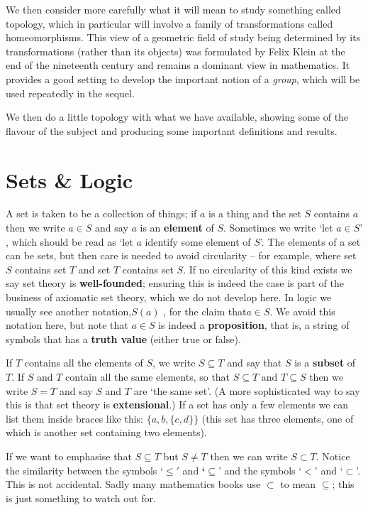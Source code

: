 \documentclass[oneside,english]{amsbook}
\numberwithin{section}{chapter}
\theoremstyle{plain}
\theoremstyle{definition}
\begin{document}
We then consider more carefully what it will mean to study something called topology, which in particular will involve a family of transformations called homeomorphisms. This view of a geometric field of study being determined by its transformations (rather than its objects) was formulated by Felix Klein at the end of the nineteenth century and remains a dominant view in mathematics. It provides a good setting to develop the important notion of a \emph{group}, which will be used repeatedly in the sequel.

We then do a little topology with what we have available, showing some of the flavour of the subject and producing some important definitions and results. 

\section{Sets \& Logic}

A set is taken to be a collection of things; if $a$ is a thing and the set $S$ contains $a$ then we write $a\in S$ and say $a$ is an \textbf{element} of $S$. Sometimes we write `let $a\in S$' , which should be read as `let $a$ identify some element of $S$'. The elements of a set can be sets, but then care is needed to avoid circularity -- for example, where set $S$ contains set $T$ and set $T$ contains set $S$. If no circularity of this kind exists we say set theory is \textbf{well-founded}; ensuring this is indeed the case is part of the business of axiomatic set theory, which we do not develop here. In logic we usually see another notation,$S(a)$ , for the claim that$a\in S$. We avoid this notation here, but note that $a\in S$ is indeed a \textbf{proposition}, that is, a string of symbols that has a \textbf{truth value} (either true or false).

If $T$ contains all the elements of $S$, we write $S\subseteq T$ and say that $S$ is a \textbf{subset} of $T$. If $S$ and $T$ contain all the same elements, so that $S\subseteq T$ and $T\subseteq S$ then we write $S=T$ and say $S$ and $T$ are `the same set'. (A more sophisticated way to say this is that set theory is \textbf{extensional}.) If a set has only a few elements we can list them inside braces like this: $\{a,b,\{c,d\}\}$ (this set has three elements, one of which is another set containing two elements).

If we want to emphasise that $S\subseteq T$ but $S\ne T$ then we can write $S\subset T$. Notice the similarity between the symbols `$\le'$ and\textbf{ `$\subseteq$}' and the symbols `$<$' and `$\subset$'. This is not accidental. Sadly many mathematics books use $\subset$ to mean $\subseteq$; this is just something to watch out for.
\end{document}
